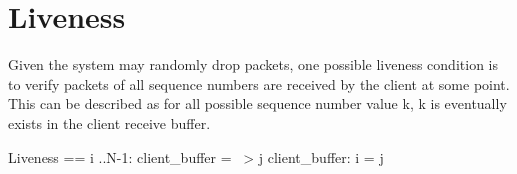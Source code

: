 \section{Liveness}

Given the system may randomly drop packets, one possible liveness condition is
to verify packets of all sequence numbers are received by the client at some
point. This can be described as for all possible sequence number value k, k is
eventually exists in the client receive buffer.\\

\begin{tla}
Liveness == 
    \A i ..N-1:
        client_buffer = {} ~> \E j \in client_buffer: i = j 
\end{tla}
\begin{tlatex}
%
%
\end{tlatex}

% 